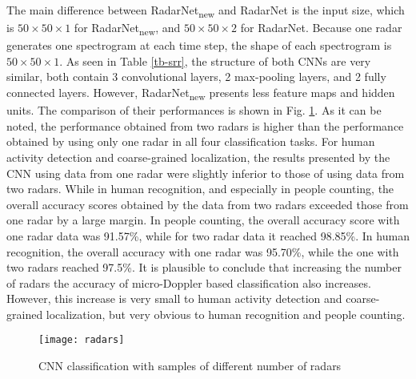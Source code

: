 The main difference between RadarNet\textsubscript{new} and RadarNet is the input size, which is $50\times 50\times 1$ for RadarNet\textsubscript{new}, and $50\times 50\times 2$ for RadarNet. Because one radar generates one spectrogram at each time step, the shape of each spectrogram is $50\times 50\times 1$. As seen in Table \ref{tb-srr}, the structure of both CNNs are very similar, both contain 3 convolutional layers, 2 max-pooling layers, and 2 fully connected layers. However, RadarNet\textsubscript{new} presents less feature maps and hidden units. The comparison of their performances is shown in Fig. \ref{fig_radars}. As it can be noted, the performance obtained from two radars is higher than the performance obtained by using only one radar in all four classification tasks. For human activity detection and coarse-grained localization, the results presented by the CNN using data from one radar were slightly inferior to those of using data from two radars. While in human recognition, and especially in people counting, the overall accuracy scores obtained by the data from two radars exceeded those from one radar by a large margin. In people counting, the overall accuracy score with one radar data was 91.57\%, while for two radar data it reached 98.85\%. In human recognition, the overall accuracy with one radar was 95.70\%, while the one with two radars reached 97.5\%. It is plausible to conclude that increasing the number of radars the accuracy of micro-Doppler based classification also increases. However, this increase is very small to human activity detection and coarse-grained localization, but very obvious to human recognition and people counting.
\begin{figure}[!ht]
         \centering
         \texttt{[image: radars]}
         \caption{CNN classification with samples of different number of radars}
         \label{fig_radars}
\end{figure}